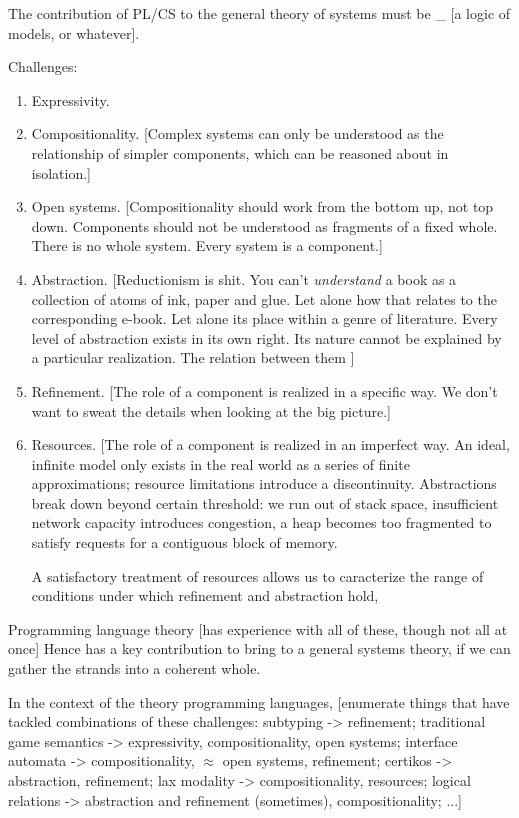 \documentclass[sigplan,10pt,review,anonymous]{acmart}
\begin{document}
The contribution of PL/CS to the general theory of systems
must be \_ [a logic of models, or whatever].

Challenges:
\begin{enumerate}
\item Expressivity.
\item Compositionality.
  [Complex systems can only be understood
  as the relationship of simpler components,
  which can be reasoned about in isolation.]
\item Open systems.
  [Compositionality should work from the bottom up, not top down.
  Components should not be understood as fragments of a fixed whole.
  There is no whole system.
  Every system is a component.]
\item Abstraction.
  [Reductionism is shit.
  You can't \emph{understand} a book
  as a collection of atoms of ink, paper and glue.
  Let alone how that relates to the corresponding e-book.
  Let alone its place within a genre of literature.
  Every level of abstraction exists in its own right.
  Its nature cannot be explained by a particular realization.
  The relation between them ]
\item Refinement.
  [The role of a component is realized in a specific way.
  We don't want to sweat the details when looking at the big picture.]
\item Resources.
  [The role of a component is realized in an imperfect way.
  An ideal, infinite model only exists in the real world
  as a series of finite approximations;
  resource limitations introduce a discontinuity.
  Abstractions break down beyond certain threshold:
  we run out of stack space,
  insufficient network capacity introduces congestion,
  a heap becomes too fragmented to satisfy
  requests for a contiguous block of memory.

  A satisfactory treatment of resources
  allows us to caracterize the range of conditions
  under which refinement and abstraction hold,
\end{enumerate}

Programming language theory [has experience with all of these, though not all at once]
Hence has a key contribution to bring to a general systems theory,
if we can gather the strands into a coherent whole.

In the context of the theory programming languages,
[enumerate things that have tackled combinations of these
challenges:
subtyping -> refinement;
traditional game semantics -> expressivity, compositionality, open systems;
interface automata -> compositionality, $\approx$ open systems, refinement;
certikos -> abstraction, refinement;
lax modality -> compositionality, resources;
logical relations -> abstraction and refinement (sometimes), compositionality;
...]
\end{document}
